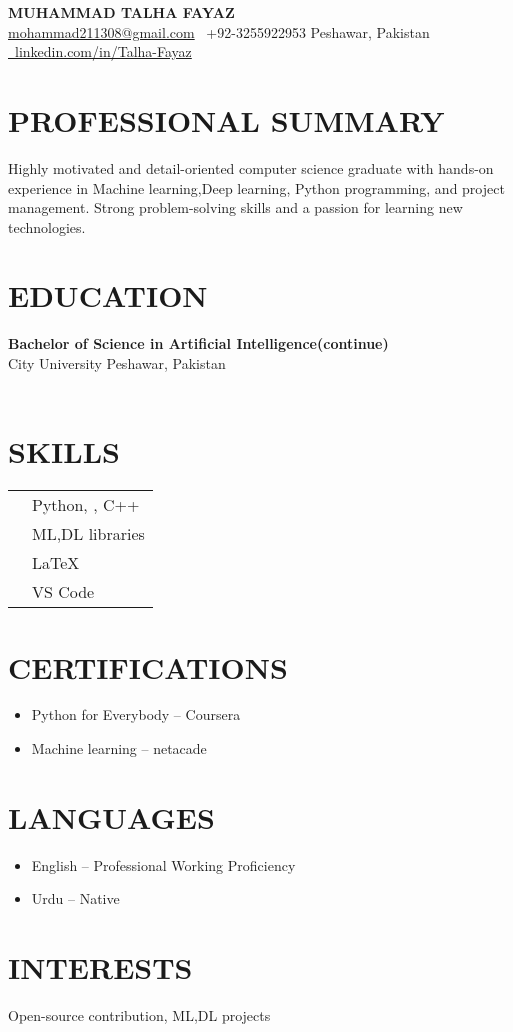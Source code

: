 \documentclass[a4paper,10pt]{article}
\newcommand{\heading}[1]{\section*{\uppercase{#1}}}
\begin{document}
\begin{center}
    {\Huge \textbf{MUHAMMAD TALHA FAYAZ}}\\[4pt]
    \href{mailto:mohammad211308@gmail.com}{mohammad211308@gmail.com} \quad
    \faPhone\ +92-3255922953 \quad
    \faMapMarker*{} Peshawar, Pakistan \quad
    \href{https://www.linkedin.com/in/Talha-Fayaz}{\faLinkedin\ linkedin.com/in/Talha-Fayaz}
\end{center}

\heading{Professional Summary}
Highly motivated and detail-oriented computer science graduate with hands-on experience in Machine learning,Deep learning, Python programming, and project management. Strong problem-solving skills and a passion for learning new technologies.

\heading{Education}
\textbf{Bachelor of Science in Artificial Intelligence(continue)} \\
City University  Peshawar, Pakistan \\

\



\heading{Skills}
\begin{tabular}{ll}
\faCode{}        & Python, , C++ \\
\faLaptopCode{}  & ML,DL libraries \\
\faPenNib{}      & \LaTeX \\
\faTools{}       & VS Code\\
\end{tabular}

\heading{Certifications}
\begin{itemize}[leftmargin=*]
    \item Python for Everybody – Coursera
    \item Machine learning – netacade
\end{itemize}

\heading{Languages}
\begin{itemize}[leftmargin=*]
    \item English – Professional Working Proficiency
    \item Urdu – Native
\end{itemize}

\heading{Interests}
Open-source contribution, ML,DL projects 
\end{document}
